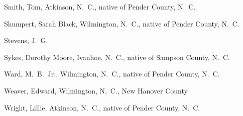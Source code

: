 \documentclass[11pt, a5paper, openright]{book}
\begin{document}
\begin{thebibliography}{99}
  Smith, Tom, Atkinson, N.~C., native of Pender County, N.~C.

  Shumpert, Sarah Black, Wilmington, N.~C., native of Pender County, N.~C.

  Stevens, J.~G.

  Sykes, Dorothy Moore, Ivanhoe, N.~C., native of Sampson County, N.~C.

  Ward, M.~B.~Jr., Wilmington, N.~C., native of Pender County, N.~C.

  Weaver, Edward, Wilmington, N.~C., New Hanover County

  Wright, Lillie, Atkinson, N.~C., native of Pender County, N.~C.

\end{thebibliography}

\printindex{}
\end{document}
